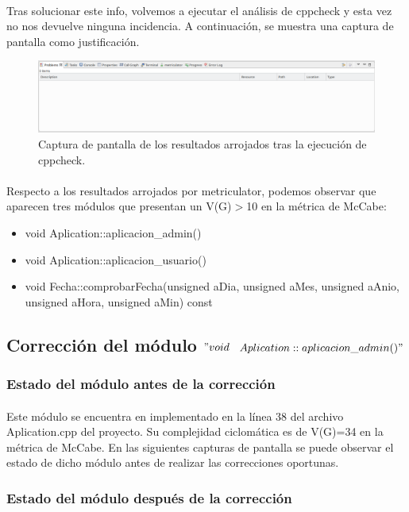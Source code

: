  		\paragraph{}Tras solucionar este info, volvemos a ejecutar el análisis de cppcheck y esta vez no nos devuelve ninguna incidencia. A continuación, se muestra una captura de pantalla como justificación.
 		
 		\begin{figure}[H]
 			\centering
 			\includegraphics[scale=0.32]{img/captura96.png}
 			\caption{Captura de pantalla de los resultados arrojados tras la ejecución de cppcheck.}
 			\label{captura96}
 		\end{figure}
 	
 		\paragraph{}Respecto a los resultados arrojados por metriculator, podemos observar que aparecen tres módulos que presentan un V(G)$>$10 en la métrica de McCabe:
 		
 		\begin{itemize}
 			\item void Aplication::aplicacion\_admin()
 			\item void Aplication::aplicacion\_usuario()
 			\item void Fecha::comprobarFecha(unsigned aDia, unsigned aMes, unsigned aAnio, unsigned aHora, unsigned aMin) const
 		\end{itemize}
 		
 		
 	\subsection{Corrección del módulo $"void$ $Aplication::aplicacion\_admin()"$}
 	
 		\subsubsection{Estado del módulo antes de la corrección}
 		
 		\paragraph{}Este módulo se encuentra en implementado en la línea 38 del archivo Aplication.cpp del proyecto. Su complejidad ciclomática es de V(G)=34 en la métrica de McCabe. En las siguientes capturas de pantalla se puede observar el estado de dicho módulo antes de realizar las correcciones oportunas.
 		
 		
 		
 		\subsubsection{Estado del módulo después de la corrección}
 		

\newpage